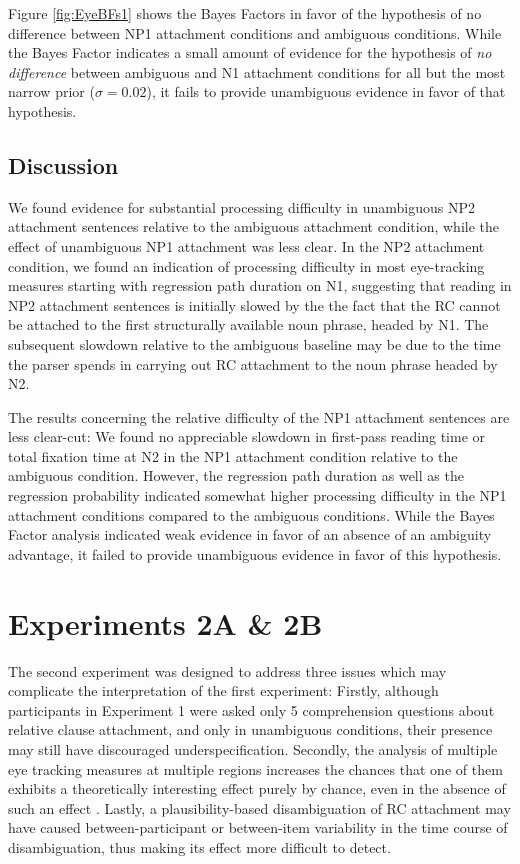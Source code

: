 \documentclass[english, doc]{apa7}\usepackage[]{graphicx}\usepackage[]{color}
\begin{document}
Figure \ref{fig:EyeBFs1} shows the Bayes Factors in favor of the hypothesis of no difference between NP1 attachment conditions and ambiguous conditions. While the Bayes Factor indicates a small amount of evidence for the hypothesis of \textit{no difference} between ambiguous and N1 attachment conditions for all but the most narrow prior ($\sigma=0.02$), it fails to provide unambiguous evidence in favor of that hypothesis.



\subsection{Discussion}

We found evidence for substantial processing difficulty in unambiguous NP2 attachment sentences relative to the ambiguous attachment condition, while the effect of unambiguous NP1 attachment was less clear. In the NP2 attachment condition, we found an indication of processing difficulty in most eye-tracking measures starting with regression path duration on N1, suggesting that reading in NP2 attachment sentences is initially slowed by the the fact that the RC cannot be attached to the first structurally available noun phrase, headed by N1. The subsequent slowdown relative to the ambiguous baseline may be due to the time the parser spends in carrying out RC attachment to the noun phrase headed by N2.

The results concerning the relative difficulty of the NP1 attachment sentences are less clear-cut: We found no appreciable slowdown in first-pass reading time or total fixation time at N2 in the NP1 attachment condition relative to the ambiguous condition. However, the regression path duration as well as the regression probability indicated somewhat higher processing difficulty in the NP1 attachment conditions compared to the ambiguous conditions. While the Bayes Factor analysis indicated weak evidence in favor of an absence of an ambiguity advantage, it failed to provide unambiguous evidence in favor of this hypothesis.


\section{Experiments {2A \& 2B}}

The second experiment was designed to address three issues which may complicate the interpretation of the first experiment: Firstly, although participants in Experiment 1 were asked only 5 comprehension questions about relative clause attachment, and only in unambiguous conditions, their presence may still have discouraged underspecification. Secondly, the analysis of multiple eye tracking measures at multiple regions increases the chances that one of them exhibits a theoretically interesting effect purely by chance, even in the absence of such an effect \cite[e.g.,][]{vonderMalsburgAngele:2017}. Lastly, a plausibility-based disambiguation of RC attachment may have caused between-participant or between-item variability in the time course of disambiguation, thus making its effect more difficult to detect.
\end{document}
